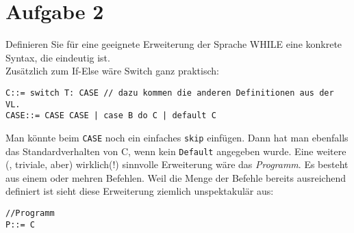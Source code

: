 \documentclass[ngerman,a4paper]{report}
\begin{document}
\section*{Aufgabe 2}
Definieren Sie für eine geeignete Erweiterung der Sprache WHILE eine konkrete Syntax, die eindeutig ist.\\
Zusätzlich zum If-Else wäre Switch ganz praktisch:
\begin{lstlisting}
C::= switch T: CASE // dazu kommen die anderen Definitionen aus der VL.
CASE::= CASE CASE | case B do C | default C
\end{lstlisting}
Man könnte beim \lstinline!CASE! noch ein einfaches \lstinline!skip! einfügen. Dann hat man ebenfalls das Standardverhalten von C, wenn kein \lstinline!Default! angegeben wurde.
Eine weitere (, triviale, aber) wirklich(!) sinnvolle Erweiterung wäre das \emph{Programm}. Es besteht aus einem oder mehren Befehlen. Weil die Menge der Befehle bereits ausreichend definiert ist sieht diese Erweiterung ziemlich unspektakulär aus:
\begin{lstlisting}
//Programm
P::= C 
\end{lstlisting}
\end{document}
